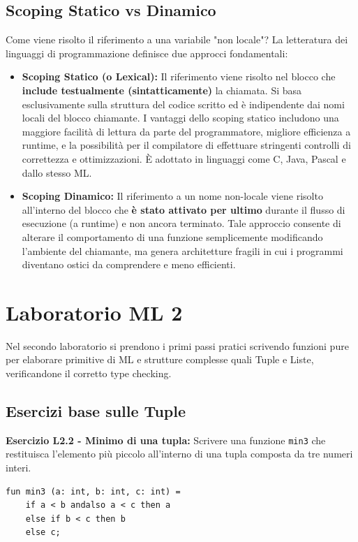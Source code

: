 \documentclass[12pt, a4paper]{article}
\begin{document}
\subsection{Scoping Statico vs Dinamico}
Come viene risolto il riferimento a una variabile "non locale"? La letteratura dei linguaggi di programmazione definisce due approcci fondamentali:
\begin{itemize}
    \item \textbf{Scoping Statico (o Lexical):} Il riferimento viene risolto nel blocco che \textbf{include testualmente (sintatticamente)} la chiamata. Si basa esclusivamente sulla struttura del codice scritto ed è indipendente dai nomi locali del blocco chiamante. I vantaggi dello scoping statico includono una maggiore facilità di lettura da parte del programmatore, migliore efficienza a runtime, e la possibilità per il compilatore di effettuare stringenti controlli di correttezza e ottimizzazioni. È adottato in linguaggi come C, Java, Pascal e dallo stesso ML.

\newpage
    
    \item \textbf{Scoping Dinamico:} Il riferimento a un nome non-locale viene risolto all'interno del blocco che \textbf{è stato attivato per ultimo} durante il flusso di esecuzione (a runtime) e non ancora terminato. Tale approccio consente di alterare il comportamento di una funzione semplicemente modificando l'ambiente del chiamante, ma genera architetture fragili in cui i programmi diventano ostici da comprendere e meno efficienti.
\end{itemize}

\section{Laboratorio ML 2}

Nel secondo laboratorio si prendono i primi passi pratici scrivendo funzioni pure per elaborare primitive di ML e strutture complesse quali Tuple e Liste, verificandone il corretto type checking.

\subsection{Esercizi base sulle Tuple}

\textbf{Esercizio L2.2 - Minimo di una tupla:}
Scrivere una funzione \texttt{min3} che restituisca l'elemento più piccolo all'interno di una tupla composta da tre numeri interi.
\begin{verbatim}
fun min3 (a: int, b: int, c: int) =
    if a < b andalso a < c then a
    else if b < c then b
    else c;
\end{verbatim}
\end{document}
